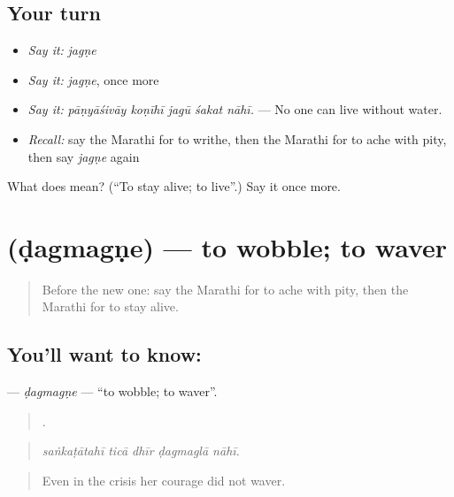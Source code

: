 \subsection*{Your turn}
\begin{itemize}
\raggedright
  \item \emph{Say it:} \emph{jagṇe}
  \item \emph{Say it:} \emph{jagṇe}, once more
  \item \emph{Say it:} \emph{pāṇyāśivāy koṇīhī jagū śakat nāhī.} — No one can live without water.
  \item \emph{Recall:} say the Marathi for to writhe, then the Marathi for to ache with pity, then say \emph{jagṇe} again
\end{itemize}

\begin{tcolorbox}[breakable,colback=teal!4,colframe=teal!35!black,title={Before you move on}]
What does  mean? (\textquotedblleft{}To stay alive; to live\textquotedblright{}.) Say it once more.
\end{tcolorbox}
\section[\texorpdfstring{\mr{डगमगणे} (ḍagmagṇe)}{डगमगणे (ḍagmagṇe)}]{ (ḍagmagṇe) — to wobble; to waver}

\label{lesson:MR-C467-dagmagne}



\begin{quote}
Before the new one: say the Marathi for to ache with pity, then the Marathi for to stay alive.
\end{quote}

\subsection*{You'll want to know: }
\textbf{} — \emph{ḍagmagṇe} — \textquotedblleft{}to wobble; to waver\textquotedblright{}.

\begin{quote}
    .
\end{quote}

\begin{quote}
\emph{saṅkaṭātahī ticā dhīr ḍagmaglā nāhī.}
\end{quote}

\begin{quote}
Even in the crisis her courage did not waver.
\end{quote}

